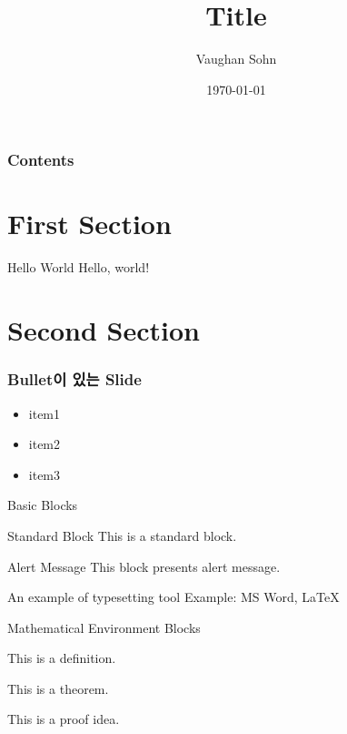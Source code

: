 \documentclass{beamer}
\title{Title}
\date{\today}
\author{Vaughan Sohn}
\begin{document}
    \maketitle

    \begin{frame}
        \frametitle{Contents}
        \tableofcontents
    \end{frame}

    \section{First Section}

    \begin{frame}{Hello World}
        Hello, world!
    \end{frame}


    \section{Second Section}


    \begin{frame}
        \frametitle{Bullet이 있는 Slide}
        \begin{itemize}
            \item item1
            \item item2
            \item item3
        \end{itemize}
    \end{frame}
    

    \begin{frame}{Basic Blocks}
        \begin{block}{Standard Block}
            This is a standard block.
        \end{block}
        \begin{alertblock}{Alert Message}
            This block presents alert message.
        \end{alertblock}
        \begin{exampleblock}{An example of typesetting tool}
            Example: MS Word, \LaTeX{}
        \end{exampleblock}
    \end{frame}
    
    \begin{frame}{Mathematical Environment Blocks}
        \begin{definition} 
            This is a definition.
        \end{definition}
        
        \begin{theorem} 
            This is a theorem. 
        \end{theorem}
        
        \begin{lemma} 
            This is a proof idea.
        \end{lemma}
    \end{frame}
    
\end{document}
